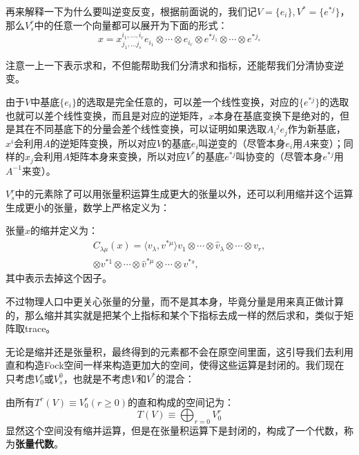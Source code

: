 再来解释一下为什么要叫逆变反变，根据前面说的，我们记$V=\{e_i\},V^*=\{e^{*j}\}$，那么$V^r_s$中的任意一个向量都可以展开为下面的形式：
\begin{equation}
	x=x^{i_1,\ldots,i_r}_{j_1,\ldots j_s}e_{i_1}\otimes\cdots \otimes e_{i_r}\otimes e^{*j_1}\otimes\cdots \otimes e^{*j_s}
\end{equation}
\begin{remark}
	注意一上一下表示求和，不但能帮助我们分清求和指标，还能帮我们分清协变逆变。
\end{remark}

由于$V$中基底$\{e_i\}$的选取是完全任意的，可以差一个线性变换，对应的$\{e^{*j}\}$的选取也就可以差个线性变换，而且是对应的逆矩阵，$x$本身在基底变换下是绝对的，但是其在不同基底下的分量会差个线性变换，可以证明如果选取${A_i}^je_j$作为新基底，$x^i$会利用$A$的逆矩阵变换，所以对应$V$的基底$e_{i}$叫逆变的（尽管本身$e_{i}$用$A$来变）；同样的$x_j$会利用$A$矩阵本身来变换，所以对应$V^*$的基底$e^{*j}$叫协变的（尽管本身$e^{*j}$用$A^{-1}$来变）。

$V^r_s$中的元素除了可以用张量积运算生成更大的张量以外，还可以利用缩并这个运算生成更小的张量，数学上严格定义为：
\begin{definition}[缩并]
	张量$x$的缩并定义为：
	\begin{equation}
		\begin{aligned}C_{\lambda\mu}(x)=\langle v_{\lambda},v^{*\mu}\rangle v_{1}\otimes\cdots\otimes\hat{v}_{\lambda}\otimes\cdots\otimes v_{r},\\\otimes v^{*1}\otimes\cdots\otimes\hat{v}^{*\mu}\otimes\cdots\otimes v^{*s},\end{aligned}
	\end{equation}
	其中$\hat{}$表示去掉这个因子。
\end{definition}
不过物理人口中更关心张量的分量，而不是其本身，毕竟分量是用来真正做计算的，那么缩并其实就是把某个上指标和某个下指标去成一样的然后求和，类似于矩阵取trace。

无论是缩并还是张量积，最终得到的元素都不会在原空间里面，这引导我们去利用直和构造Fock空间一样来构造更加大的空间，使得这些运算是封闭的。我们现在只考虑$V^r_0$或$V_s^0$，也就是不考虑$V$和$V^*$的混合：
\begin{definition}[张量代数]
	由所有$T^r(V)\equiv V^r_0(r\geq 0)$的直和构成的空间记为：
	\begin{equation}
		T(V)\equiv \bigoplus_{r=0} V^r_0
	\end{equation}
	显然这个空间没有缩并运算，但是在张量积运算下是封闭的，构成了一个代数，称为\textbf{张量代数}。
\end{definition}

